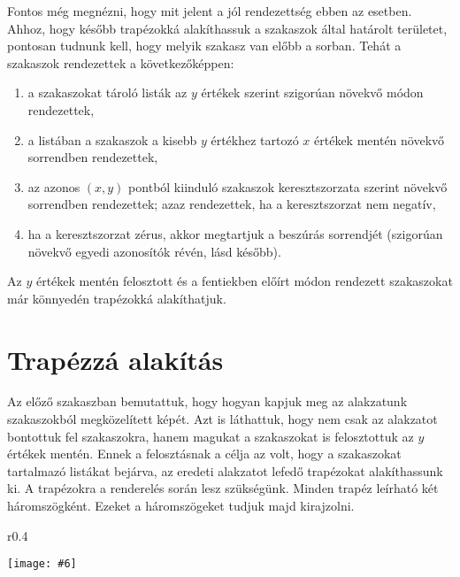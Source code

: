 \documentclass[12pt]{report}
\makeatletter
\theoremstyle{definition}
\newcommand{\melyikoldalra}{r}
\newlength{\Xoffset}
\newlength{\Yoffset}
\newcommand*{\setpdfoffset}[2]{%
  \setlength{\Xoffset}{#1}%
  \setlength{\Yoffset}{#2}%
}
\newcommand*{\setviewport}[4]{%
  \def\x@viewport{%
    {\the\dimexpr#1-\Xoffset}
    {\the\dimexpr#2-\Yoffset}
    {\the\dimexpr#3-\Xoffset}
    {\the\dimexpr#4-\Yoffset}%
  }%
}
\newcommand{\includegraphicskivagas}[6]{
    \setpdfoffset{0pt}{0pt}
    \setviewport{#1}{#2}{#3}{#4}
    \texttt{[image: \#6]}
}
\newcommand{\includedataflowkivagas}[5]{
    \includegraphicskivagas{#1}{#2}{#3}{#4}{scale=0.6,#5}
    {img/built/dataflow_eps}
}
\makeatother
\begin{document}
Fontos még megnézni, hogy mit jelent a jól rendezettség ebben az esetben.
Ahhoz, hogy később trapézokká alakíthassuk a szakaszok által határolt
területet, pontosan tudnunk kell, hogy melyik szakasz van előbb a sorban. Tehát
a szakaszok rendezettek a következőképpen:
  \begin{enumerate}
    \item a szakaszokat tároló listák az $y$ értékek szerint szigorúan
    növekvő módon rendezettek,
    \item a listában a szakaszok a kisebb $y$ értékhez tartozó $x$
    értékek mentén növekvő sorrendben rendezettek,
    \item az azonos $(x, y)$ pontból kiinduló szakaszok keresztszorzata
    szerint növekvő sorrendben rendezettek; azaz rendezettek, ha a
    keresztszorzat nem negatív,
    \item ha a keresztszorzat zérus, akkor megtartjuk a beszúrás sorrendjét
    (szigorúan növekvő egyedi azonosítók révén, lásd később).
  \end{enumerate}

Az $y$ értékek mentén felosztott és a fentiekben előírt módon rendezett
szakaszokat már könnyedén trapézokká alakíthatjuk.

  \section{Trapézzá alakítás}

Az előző szakaszban bemutattuk, hogy hogyan kapjuk meg az alakzatunk
szakaszokból megközelített képét. Azt is láthattuk, hogy nem csak az alakzatot
bontottuk fel szakaszokra, hanem magukat a szakaszokat is felosztottuk az $y$
értékek mentén. Ennek a felosztásnak a célja az volt, hogy a szakaszokat
tartalmazó listákat bejárva, az eredeti alakzatot lefedő trapézokat
alakíthassunk ki. A trapézokra a renderelés során lesz szükségünk. Minden
trapéz leírható két háromszögként. Ezeket a háromszögeket tudjuk majd
kirajzolni.

  \begin{wrapfigure}{\melyikoldalra}{0.4\textwidth}
    \begin{center}
      \includedataflowkivagas{345pt}{200pt}{525pt}{393pt}{}
    \end{center}
    \caption{\label{fig:dataflow-trapezoid} A trapézzá alakítás és
    összevonás lépései \\ (Részlet \az+\emph{\ref{appendix:dataflow}.
    folyamatábrából}.)}
  \end{wrapfigure}
\end{document}
